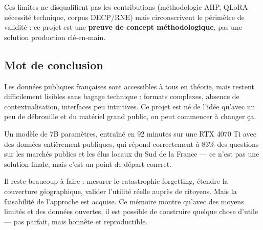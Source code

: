 Ces limites ne disqualifient pas les contributions (méthodologie AHP, QLoRA nécessité technique, corpus DECP/RNE) mais circonscrivent le périmètre de validité : ce projet est une \textbf{preuve de concept méthodologique}, pas une solution production clé-en-main.

\subsection{Mot de conclusion}

Les données publiques françaises sont accessibles à tous en théorie, mais restent difficilement lisibles sans bagage technique : formats complexes, absence de contextualisation, interfaces peu intuitives. Ce projet est né de l'idée qu'avec un peu de débrouille et du matériel grand public, on peut commencer à changer ça.

Un modèle de 7B paramètres, entraîné en 92 minutes sur une RTX 4070 Ti avec des données entièrement publiques, qui répond correctement à 83\% des questions sur les marchés publics et les élus locaux du Sud de la France --- ce n'est pas une solution finale, mais c'est un point de départ concret.

Il reste beaucoup à faire : mesurer le catastrophic forgetting, étendre la couverture géographique, valider l'utilité réelle auprès de citoyens. Mais la faisabilité de l'approche est acquise. Ce mémoire montre qu'avec des moyens limités et des données ouvertes, il est possible de construire quelque chose d'utile --- pas parfait, mais honnête et reproductible.
